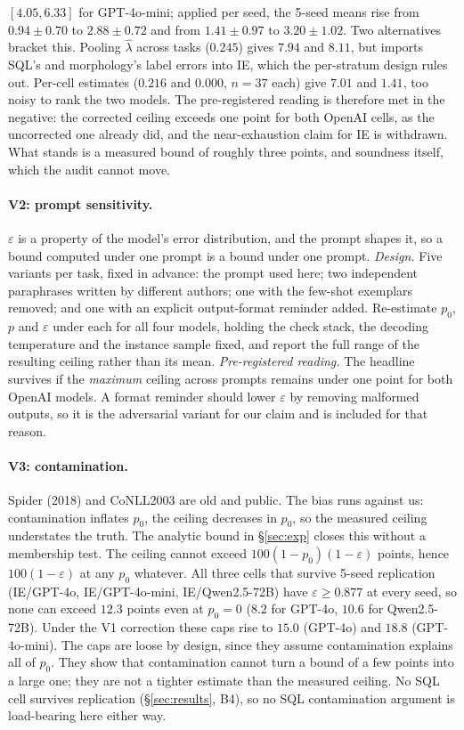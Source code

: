 \documentclass[11pt]{article}
\begin{document}
$[4.05,6.33]$ for GPT-4o-mini; applied per seed, the 5-seed means rise from
$0.94\pm0.70$ to $2.88\pm0.72$ and from $1.41\pm0.97$ to $3.20\pm1.02$.
Two alternatives bracket this. Pooling $\hat\lambda$ across tasks ($0.245$)
gives $7.94$ and $8.11$, but imports SQL's and morphology's label errors into
IE, which the per-stratum design rules out. Per-cell estimates ($0.216$ and
$0.000$, $n{=}37$ each) give $7.01$ and $1.41$, too noisy to rank the two
models. The pre-registered reading is therefore met in the negative: the
corrected ceiling exceeds one point for both OpenAI cells, as the uncorrected
one already did, and the near-exhaustion claim for IE is withdrawn. What
stands is a measured bound of roughly three points, and soundness itself,
which the audit cannot move.

\paragraph{V2: prompt sensitivity.} $\varepsilon$ is a property of the model's
error distribution, and the prompt shapes it, so a bound computed under one
prompt is a bound under one prompt. \emph{Design.} Five variants per task, fixed
in advance: the prompt used here; two independent paraphrases written by
different authors; one with the few-shot exemplars removed; and one with an
explicit output-format reminder added. Re-estimate $p_0$, $p$ and $\varepsilon$
under each for all four models, holding the check stack, the decoding
temperature and the instance sample fixed, and report the full range of the
resulting ceiling rather than its mean. \emph{Pre-registered reading.} The
headline survives if the \emph{maximum} ceiling across prompts remains under one
point for both OpenAI models. A format reminder should lower $\varepsilon$ by
removing malformed outputs, so it is the adversarial variant for our claim and is
included for that reason.

\paragraph{V3: contamination.} Spider (2018) and CoNLL2003 are old and public.
The bias runs against us: contamination inflates $p_0$, the ceiling decreases in
$p_0$, so the measured ceiling understates the truth. The analytic bound in
\S\ref{sec:exp} closes this without a membership test. The ceiling cannot
exceed $100(1-p_0)(1-\varepsilon)$ points, hence $100(1-\varepsilon)$ at any
$p_0$ whatever. All three cells that survive 5-seed replication
(IE/GPT-4o, IE/GPT-4o-mini, IE/Qwen2.5-72B) have $\varepsilon\ge0.877$ at
every seed, so none can exceed $12.3$ points even at $p_0=0$ ($8.2$ for
GPT-4o, $10.6$ for Qwen2.5-72B). Under the V1 correction these caps rise
to $15.0$ (GPT-4o) and $18.8$ (GPT-4o-mini). The caps are loose by design,
since they assume contamination explains all of $p_0$. They show that
contamination cannot turn a bound of a few points into a large one; they
are not a tighter estimate than the measured ceiling. No SQL cell survives replication
(\S\ref{sec:results}, B4), so no SQL contamination argument is load-bearing
here either way.
\end{document}
